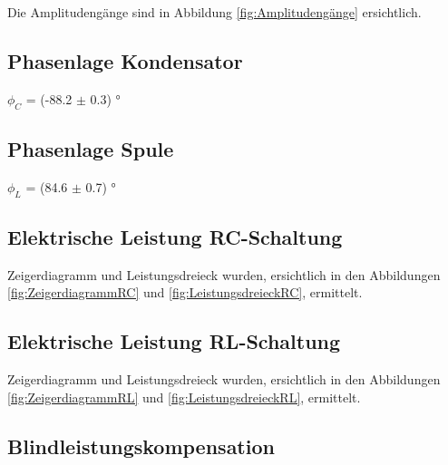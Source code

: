 \documentclass[12pt,a4paper,twoside]{article}
\begin{document}
Die Amplitudengänge sind in Abbildung \ref{fig:Amplitudengänge} ersichtlich.


\subsection{Phasenlage Kondensator}

$\phi_C$ = (-88.2 $\pm$ 0.3) ° 


\subsection{Phasenlage Spule}

$\phi_L$ = (84.6 $\pm$ 0.7) ° 


\subsection{Elektrische Leistung RC-Schaltung}

Zeigerdiagramm und Leistungsdreieck wurden, ersichtlich in den Abbildungen \ref{fig:ZeigerdiagrammRC} und \ref{fig:LeistungsdreieckRC}, ermittelt.

\subsection{Elektrische Leistung RL-Schaltung}

Zeigerdiagramm und Leistungsdreieck wurden, ersichtlich in den Abbildungen \ref{fig:ZeigerdiagrammRL} und \ref{fig:LeistungsdreieckRL}, ermittelt.

\subsection{Blindleistungskompensation}



\printbibliography[heading=bibintoc]
\end{document}
